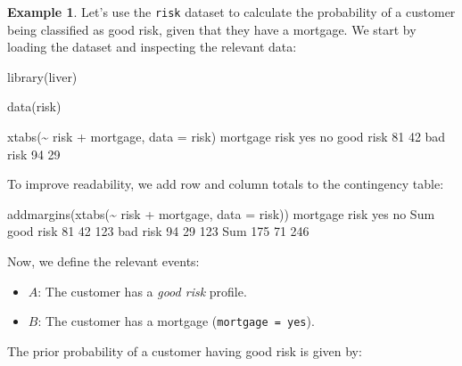 \documentclass[
  11pt,
]{book}
\makeatletter
\newenvironment{Shaded}{}{}
\newcommand{\AttributeTok}[1]{#1}
\newcommand{\DecValTok}[1]{#1}
\newcommand{\FunctionTok}[1]{#1}
\newcommand{\NormalTok}[1]{#1}
\newcommand{\SpecialCharTok}[1]{\textcolor[rgb]{0.39,0.39,0.39}{#1}}
\providecommand{\tightlist}{%
  \setlength{\itemsep}{0pt}\setlength{\parskip}{0pt}}
\newenvironment{kframe}{%
\medskip{}
\setlength{\fboxsep}{.8em}
 \def\at@end@of@kframe{}%
 \ifinner\ifhmode%
  \def\at@end@of@kframe{\end{minipage}}%
  \begin{minipage}{\columnwidth}%
 \fi\fi%
 \def\FrameCommand##1{\hskip\@totalleftmargin \hskip-\fboxsep
 \colorbox{shadecolor}{##1}\hskip-\fboxsep
     \hskip-\linewidth \hskip-\@totalleftmargin \hskip\columnwidth}%
 \MakeFramed {\advance\hsize-\width
   \@totalleftmargin\z@ \linewidth\hsize
   \@setminipage}}%
 {\par\unskip\endMakeFramed%
 \at@end@of@kframe}
\renewenvironment{Shaded}{\begin{kframe}}{\end{kframe}}
\theoremstyle{definition}
\theoremstyle{definition}
\newtheorem{example}{Example}[chapter]
\theoremstyle{definition}
\theoremstyle{definition}
\theoremstyle{remark}
\makeatother
\begin{document}
\begin{example}
\protect\hypertarget{exm:ex-bayes-risk}{}\label{exm:ex-bayes-risk}Let's use the \texttt{risk} dataset to calculate the probability of a customer being classified as good risk, given that they have a mortgage. We start by loading the dataset and inspecting the relevant data:

\begin{Shaded}
\begin{Highlighting}[]
\FunctionTok{library}\NormalTok{(liver)         }

\FunctionTok{data}\NormalTok{(risk)}

\FunctionTok{xtabs}\NormalTok{(}\SpecialCharTok{\textasciitilde{}}\NormalTok{ risk }\SpecialCharTok{+}\NormalTok{ mortgage, }\AttributeTok{data =}\NormalTok{ risk)}
\NormalTok{              mortgage}
\NormalTok{   risk        yes no}
\NormalTok{     good risk  }\DecValTok{81} \DecValTok{42}
\NormalTok{     bad risk   }\DecValTok{94} \DecValTok{29}
\end{Highlighting}
\end{Shaded}

To improve readability, we add row and column totals to the contingency table:

\begin{Shaded}
\begin{Highlighting}[]
\FunctionTok{addmargins}\NormalTok{(}\FunctionTok{xtabs}\NormalTok{(}\SpecialCharTok{\textasciitilde{}}\NormalTok{ risk }\SpecialCharTok{+}\NormalTok{ mortgage, }\AttributeTok{data =}\NormalTok{ risk))}
\NormalTok{              mortgage}
\NormalTok{   risk        yes  no Sum}
\NormalTok{     good risk  }\DecValTok{81}  \DecValTok{42} \DecValTok{123}
\NormalTok{     bad risk   }\DecValTok{94}  \DecValTok{29} \DecValTok{123}
\NormalTok{     Sum       }\DecValTok{175}  \DecValTok{71} \DecValTok{246}
\end{Highlighting}
\end{Shaded}

Now, we define the relevant events:

\begin{itemize}
\tightlist
\item
  \(A\): The customer has a \emph{good risk} profile.\\
\item
  \(B\): The customer has a mortgage (\texttt{mortgage\ =\ yes}).
\end{itemize}

The prior probability of a customer having good risk is given by:


\end{example}
\end{document}
